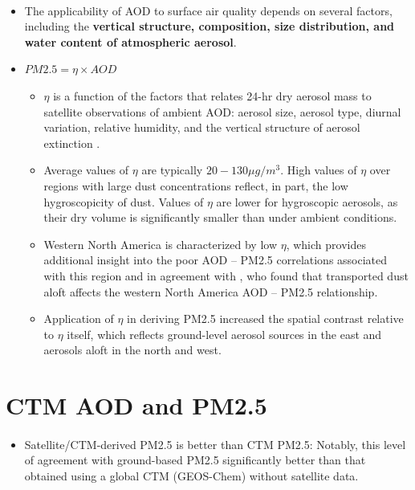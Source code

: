 \documentclass[11pt]{article}
\begin{document}
\paragraph{\citet{van2010global}}
\begin{itemize}
    \item The applicability of AOD to surface air quality depends on several factors, including the \textbf{vertical structure, composition, size distribution, and water content of atmospheric aerosol}.
    \item $PM2.5=\eta\times AOD$
    \begin{itemize}
        \item $\eta$ is a function of the factors that relates 24-hr dry aerosol mass to satellite observations of ambient AOD: aerosol size, aerosol type, diurnal variation, relative humidity, and the vertical structure of aerosol extinction \citep{van2006estimating}.
        \item Average values of $\eta$ are typically $20 - 130 \mu g/m^3$. High values of $\eta$ over regions with large dust concentrations \citep{prospero2002environmental} reflect, in part, the low hygroscopicity of dust. Values of $\eta$ are lower for hygroscopic aerosols, as their dry volume is significantly smaller than under ambient conditions.
        \item Western North America is characterized by low $\eta$, which provides additional insight into the poor AOD -- PM2.5 correlations associated with this region and in agreement with \citet{liu2007estimating}, who found that transported dust aloft affects the western North America AOD -- PM2.5 relationship. 
        \item Application of $\eta$ in deriving PM2.5 increased the spatial contrast relative to $\eta$ itself, which reflects ground-level aerosol sources in the east and aerosols aloft in the north and west.
    \end{itemize}
\end{itemize}


\section{CTM AOD and PM2.5}

\paragraph{\citet{van2010global}}
\begin{itemize}
    \item Satellite/CTM-derived PM2.5 is better than CTM PM2.5:  Notably, this level of agreement with ground-based PM2.5 significantly better than that obtained using a global CTM (GEOS-Chem) without satellite data. 
\end{itemize}
\end{document}
